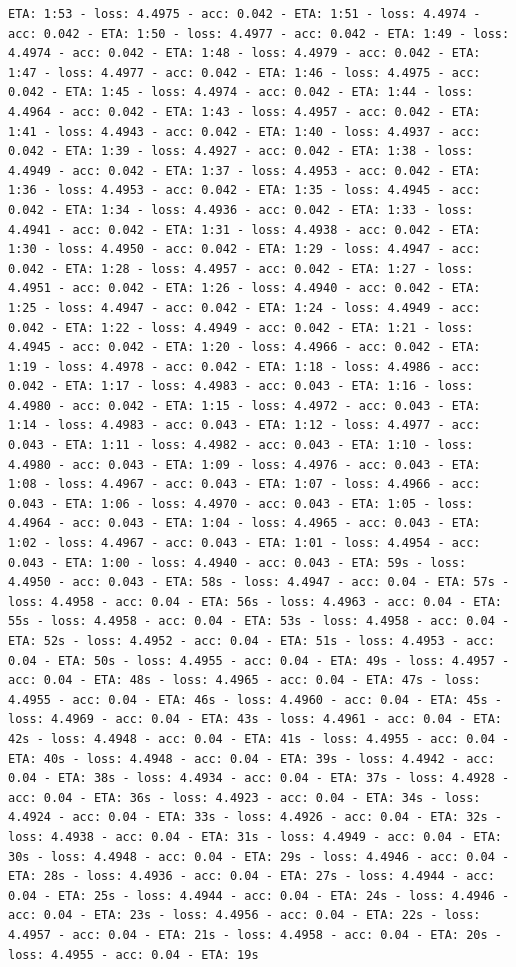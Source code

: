 \documentclass[11pt]{article}
\begin{document}
\begin{Verbatim}[commandchars=\\\{\}]
ETA: 1:53 - loss: 4.4975 - acc: 0.042 - ETA: 1:51 - loss: 4.4974 - acc: 0.042 - ETA: 1:50 - loss: 4.4977 - acc: 0.042 - ETA: 1:49 - loss: 4.4974 - acc: 0.042 - ETA: 1:48 - loss: 4.4979 - acc: 0.042 - ETA: 1:47 - loss: 4.4977 - acc: 0.042 - ETA: 1:46 - loss: 4.4975 - acc: 0.042 - ETA: 1:45 - loss: 4.4974 - acc: 0.042 - ETA: 1:44 - loss: 4.4964 - acc: 0.042 - ETA: 1:43 - loss: 4.4957 - acc: 0.042 - ETA: 1:41 - loss: 4.4943 - acc: 0.042 - ETA: 1:40 - loss: 4.4937 - acc: 0.042 - ETA: 1:39 - loss: 4.4927 - acc: 0.042 - ETA: 1:38 - loss: 4.4949 - acc: 0.042 - ETA: 1:37 - loss: 4.4953 - acc: 0.042 - ETA: 1:36 - loss: 4.4953 - acc: 0.042 - ETA: 1:35 - loss: 4.4945 - acc: 0.042 - ETA: 1:34 - loss: 4.4936 - acc: 0.042 - ETA: 1:33 - loss: 4.4941 - acc: 0.042 - ETA: 1:31 - loss: 4.4938 - acc: 0.042 - ETA: 1:30 - loss: 4.4950 - acc: 0.042 - ETA: 1:29 - loss: 4.4947 - acc: 0.042 - ETA: 1:28 - loss: 4.4957 - acc: 0.042 - ETA: 1:27 - loss: 4.4951 - acc: 0.042 - ETA: 1:26 - loss: 4.4940 - acc: 0.042 - ETA: 1:25 - loss: 4.4947 - acc: 0.042 - ETA: 1:24 - loss: 4.4949 - acc: 0.042 - ETA: 1:22 - loss: 4.4949 - acc: 0.042 - ETA: 1:21 - loss: 4.4945 - acc: 0.042 - ETA: 1:20 - loss: 4.4966 - acc: 0.042 - ETA: 1:19 - loss: 4.4978 - acc: 0.042 - ETA: 1:18 - loss: 4.4986 - acc: 0.042 - ETA: 1:17 - loss: 4.4983 - acc: 0.043 - ETA: 1:16 - loss: 4.4980 - acc: 0.042 - ETA: 1:15 - loss: 4.4972 - acc: 0.043 - ETA: 1:14 - loss: 4.4983 - acc: 0.043 - ETA: 1:12 - loss: 4.4977 - acc: 0.043 - ETA: 1:11 - loss: 4.4982 - acc: 0.043 - ETA: 1:10 - loss: 4.4980 - acc: 0.043 - ETA: 1:09 - loss: 4.4976 - acc: 0.043 - ETA: 1:08 - loss: 4.4967 - acc: 0.043 - ETA: 1:07 - loss: 4.4966 - acc: 0.043 - ETA: 1:06 - loss: 4.4970 - acc: 0.043 - ETA: 1:05 - loss: 4.4964 - acc: 0.043 - ETA: 1:04 - loss: 4.4965 - acc: 0.043 - ETA: 1:02 - loss: 4.4967 - acc: 0.043 - ETA: 1:01 - loss: 4.4954 - acc: 0.043 - ETA: 1:00 - loss: 4.4940 - acc: 0.043 - ETA: 59s - loss: 4.4950 - acc: 0.043 - ETA: 58s - loss: 4.4947 - acc: 0.04 - ETA: 57s - loss: 4.4958 - acc: 0.04 - ETA: 56s - loss: 4.4963 - acc: 0.04 - ETA: 55s - loss: 4.4958 - acc: 0.04 - ETA: 53s - loss: 4.4958 - acc: 0.04 - ETA: 52s - loss: 4.4952 - acc: 0.04 - ETA: 51s - loss: 4.4953 - acc: 0.04 - ETA: 50s - loss: 4.4955 - acc: 0.04 - ETA: 49s - loss: 4.4957 - acc: 0.04 - ETA: 48s - loss: 4.4965 - acc: 0.04 - ETA: 47s - loss: 4.4955 - acc: 0.04 - ETA: 46s - loss: 4.4960 - acc: 0.04 - ETA: 45s - loss: 4.4969 - acc: 0.04 - ETA: 43s - loss: 4.4961 - acc: 0.04 - ETA: 42s - loss: 4.4948 - acc: 0.04 - ETA: 41s - loss: 4.4955 - acc: 0.04 - ETA: 40s - loss: 4.4948 - acc: 0.04 - ETA: 39s - loss: 4.4942 - acc: 0.04 - ETA: 38s - loss: 4.4934 - acc: 0.04 - ETA: 37s - loss: 4.4928 - acc: 0.04 - ETA: 36s - loss: 4.4923 - acc: 0.04 - ETA: 34s - loss: 4.4924 - acc: 0.04 - ETA: 33s - loss: 4.4926 - acc: 0.04 - ETA: 32s - loss: 4.4938 - acc: 0.04 - ETA: 31s - loss: 4.4949 - acc: 0.04 - ETA: 30s - loss: 4.4948 - acc: 0.04 - ETA: 29s - loss: 4.4946 - acc: 0.04 - ETA: 28s - loss: 4.4936 - acc: 0.04 - ETA: 27s - loss: 4.4944 - acc: 0.04 - ETA: 25s - loss: 4.4944 - acc: 0.04 - ETA: 24s - loss: 4.4946 - acc: 0.04 - ETA: 23s - loss: 4.4956 - acc: 0.04 - ETA: 22s - loss: 4.4957 - acc: 0.04 - ETA: 21s - loss: 4.4958 - acc: 0.04 - ETA: 20s - loss: 4.4955 - acc: 0.04 - ETA: 19s 
\end{Verbatim}
\end{document}

